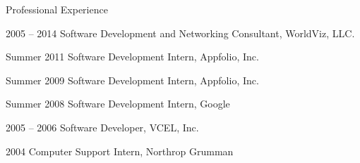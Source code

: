 \begin{vitae}
{\pagebreak

\begin{vitaesection}{Professional Experience}
  \item [2005 -- 2014] Software Development and Networking Consultant,
    WorldViz, LLC.
  \item [Summer 2011] Software Development Intern, Appfolio, Inc.
  \item [Summer 2009] Software Development Intern, Appfolio, Inc.
  \item [Summer 2008] Software Development Intern, Google
  \item [2005 -- 2006] Software Developer, VCEL, Inc.
  \item [2004] Computer Support Intern, Northrop Grumman
\end{vitaesection}

}
\end{vitae}
